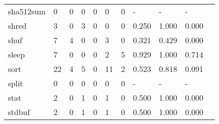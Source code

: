 \begin{longtable}{lp{1.10cm}p{1.10cm}p{1.10cm}p{1.10cm}p{1.10cm}p{1.10cm}p{1.10cm}p{1.10cm}p{1.10cm}p{1.10cm}}
sha512sum &                      0 &                                  0 &                                 0 &                                0 &                                 0 &                               0 &                              - &                                     - &                                   - \\
shred     &                      3 &                                  0 &                                 3 &                                0 &                                 0 &                               0 &                          0.250 &                                 1.000 &                               0.000 \\
shuf      &                      7 &                                  4 &                                 0 &                                0 &                                 3 &                               0 &                          0.321 &                                 0.429 &                               0.000 \\
sleep     &                      7 &                                  0 &                                 0 &                                0 &                                 2 &                               5 &                          0.929 &                                 1.000 &                               0.714 \\
sort      &                     22 &                                  4 &                                 5 &                                0 &                                11 &                               2 &                          0.523 &                                 0.818 &                               0.091 \\
split     &                      0 &                                  0 &                                 0 &                                0 &                                 0 &                               0 &                              - &                                     - &                                   - \\
stat      &                      2 &                                  0 &                                 1 &                                0 &                                 1 &                               0 &                          0.500 &                                 1.000 &                               0.000 \\
stdbuf    &                      2 &                                  0 &                                 1 &                                0 &                                 1 &                               0 &                          0.500 &                                 1.000 &                               0.000 \\

\end{longtable}
